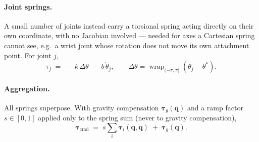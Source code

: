 \paragraph{Joint springs.} A small number of joints instead carry a torsional
spring acting directly on their own coordinate, with no Jacobian involved
--- needed for axes a Cartesian spring cannot see, e.g.\ a wrist joint whose
rotation does not move its own attachment point. For joint $j$,
%
\begin{equation}
  \tau_{j} \;=\; -\,k\,\Delta\theta \;-\; b\,\dot{\theta}_{j},
  \qquad
  \Delta\theta = \operatorname{wrap}_{(-\pi,\pi]}(\theta_{j} - \theta^{*}).
  \label{eq:summary-joint}
\end{equation}

\paragraph{Aggregation.} All springs superpose. With gravity compensation
$\bm{\tau}_{g}(\bm{q})$ and a ramp factor $s \in [0,1]$ applied only to the
spring sum (never to gravity compensation),
%
\begin{equation}
  \bm{\tau}_{\mathrm{cmd}} \;=\; s\sum_{i} \bm{\tau}_{i}(\bm{q}, \dot{\bm{q}})
  \;+\; \bm{\tau}_{g}(\bm{q}).
  \label{eq:summary-total}
\end{equation}
